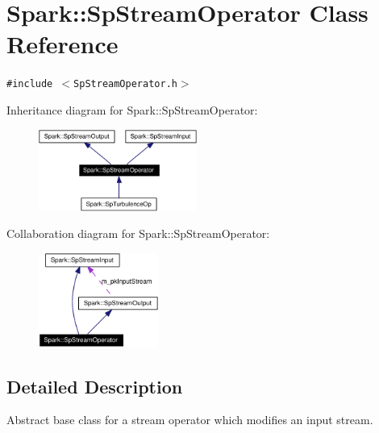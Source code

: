 \section{Spark::Sp\-Stream\-Operator Class Reference}
\label{classSpark_1_1SpStreamOperator}
{\tt \#include $<$Sp\-Stream\-Operator.h$>$}

Inheritance diagram for Spark::Sp\-Stream\-Operator:\begin{figure}[H]
\begin{center}
\leavevmode
\includegraphics[width=147pt]{classSpark_1_1SpStreamOperator__inherit__graph}
\end{center}
\end{figure}
Collaboration diagram for Spark::Sp\-Stream\-Operator:\begin{figure}[H]
\begin{center}
\leavevmode
\includegraphics[width=111pt]{classSpark_1_1SpStreamOperator__coll__graph}
\end{center}
\end{figure}


\subsection{Detailed Description}
Abstract base class for a stream operator which modifies an input stream. 

